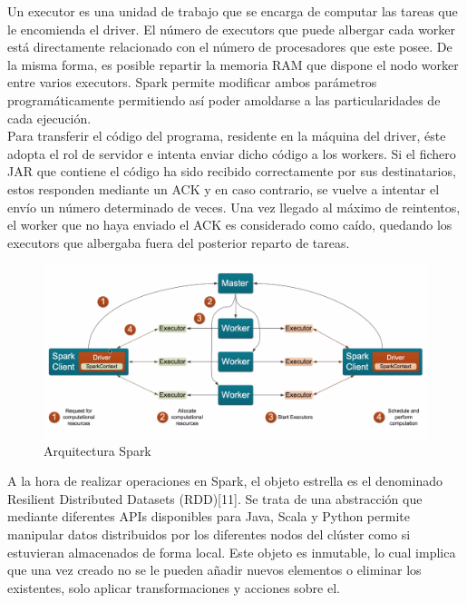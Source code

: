 Un executor es una unidad de trabajo que se encarga de computar las tareas que le encomienda el driver. El número de executors que puede albergar cada worker está directamente relacionado con el número de procesadores que este posee. De la misma forma, es posible repartir la memoria RAM que dispone el nodo worker entre varios executors. Spark permite modificar ambos parámetros programáticamente permitiendo así poder amoldarse a las particularidades de cada ejecución.\\

Para transferir el código del programa, residente en la máquina del driver, éste adopta  el rol de servidor e intenta enviar dicho código a los workers. Si el fichero JAR que contiene el código ha sido recibido correctamente por sus destinatarios, estos responden mediante un ACK y en caso contrario, se vuelve a intentar el envío un número determinado de veces. Una vez llegado al máximo de reintentos, el worker que no haya enviado el ACK es considerado como caído, quedando los executors que albergaba fuera del posterior reparto de tareas.\\

\begin{figure}[h]
	\centering
	\includegraphics[width=1\textwidth]{Ilustraciones/spark_architecture.png}
	\caption{Arquitectura Spark}
	\label{fig:spark_architecture}
\end{figure}

A la hora de realizar operaciones en Spark, el objeto estrella es el denominado Resilient Distributed Datasets (RDD)[11]. Se trata de una abstracción que mediante diferentes APIs disponibles para Java, Scala y Python permite manipular datos distribuidos por los diferentes nodos del clúster como si estuvieran almacenados de forma local. Este objeto es inmutable, lo cual implica que una vez creado no se le pueden añadir nuevos elementos o eliminar los existentes, solo aplicar transformaciones y acciones sobre el.\\

